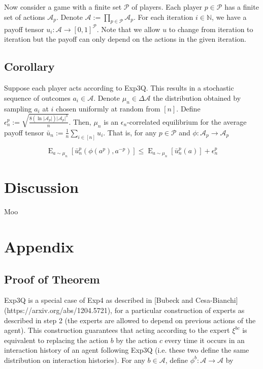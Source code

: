 \documentclass[a4paper]{article}
\DeclareMathOperator{\E}{E}
\newcommand{\Nats}{\mathbb{N}}
\newcommand{\Abs}[1]{\lvert #1 \rvert}
\newcommand{\Act}{\mathcal{A}}
\newcommand{\Play}{\mathcal{P}}
\begin{document}
Now consider a game with a finite set ${\Play}$ of players. Each player ${p \in \Play}$ has a finite set of actions ${\Act_p}$. Denote ${\Act:=\prod_{p \in \Play} \Act_p}$. For each iteration ${i \in \Nats}$, we have a payoff tensor ${u_i: \Act \rightarrow [0,1]^\Play}$. Note that we allow ${u}$ to change from iteration to iteration but the payoff can only depend on the actions in the given iteration.

\subsection{Corollary}

Suppose each player acts according to Exp3Q. This results in a stochastic sequence of outcomes ${a_i \in \Act}$. Denote ${\mu_n \in \Delta \Act}$ the distribution obtained by sampling ${a_i}$ at ${i}$ chosen uniformly at random from ${[n]}$. Define ${\epsilon_n^p:=\sqrt{\frac{8(\ln \Abs{\Act_p}) \Abs{\Act_p}^3}{n}}}$. Then, ${\mu_n}$ is an ${\epsilon_n}$-correlated equilibrium for the average payoff tensor $\bar{u}_n:={\frac{1}{n} \sum_{i \in [n]} u_i}$. That is, for any ${p \in \Play}$ and ${\phi: \Act_p \rightarrow \Act_p}$

$$\E_{a \sim \mu_n}[\bar{u}_n^p(\phi(a^p), a^{-p})] \leq \E_{a \sim \mu_n}[\bar{u}_n^p(a)] + \epsilon_n^p$$

\section{Discussion}

Moo

\section{Appendix}

\subsection{Proof of Theorem}

Exp3Q is a special case of Exp4 as described in [Bubeck and Cesa-Bianchi](https://arxiv.org/abs/1204.5721), for a particular construction of experts as described in step 2 (the experts are allowed to depend on previous actions of the agent). This construction guarantees that acting according to the expert ${\xi^{bc}}$ is equivalent to replacing the action ${b}$ by the action ${c}$ every time it occurs in an interaction history of an agent following Exp3Q (i.e. these two define the same distribution on interaction histories). For any ${b \in \Act}$, define ${\phi^b: \Act \rightarrow \Act}$ by
\end{document}
